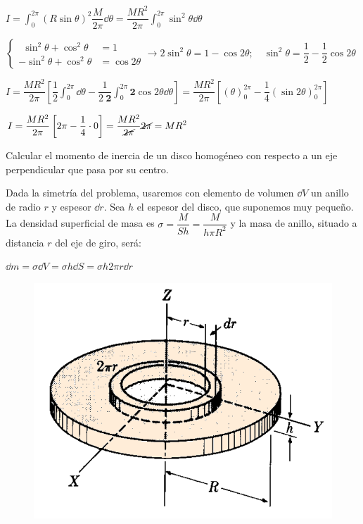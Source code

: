$\displaystyle I=\int_0^{2\pi} (R\sin \theta)^2 \dfrac {M}{2\pi} \dd \theta
= \dfrac{MR^2}{2\pi} \int_0^{2\pi} \sin^2 \theta \dd \theta$

\small{$\begin{cases} \ \ \sin^2 \theta+\cos^2\theta &=1 \\ -\sin^2\theta+\cos^2\theta &=\cos 2\theta \end{cases} \to 2\sin^2\theta=1-\cos 2\theta;\quad \sin^2\theta=\dfrac 1 2 -\dfrac 1 2 \cos 2 \theta$}

\normalsize{$\displaystyle I=\dfrac{MR^2}{2\pi} \left[ \dfrac 1 2 \int_0^{2\pi} \dd \theta - \dfrac 1 {2\ \boldsymbol{2}}\int_0^{2\pi}\boldsymbol{2}\cos 2\theta \dd \theta \right] $}$=\displaystyle \dfrac{MR^2}{2\pi} \left[ \left(\theta \right)_0^{2\pi}-\dfrac 1 4 \left( \sin 2\theta \right)_0^{2\pi} \right] $

$\displaystyle I=\dfrac{MR^2}{2\pi} \left[ 2\pi-\dfrac 1 4 \cdot 0 \right]=
\dfrac{MR^2}{\cancel{2\pi}} \cancel{2\pi}=MR^2$

\vspace{10mm} %
\begin{prob}
Calcular el momento de inercia de un disco homogéneo con respecto a un eje perpendicular que pasa por su centro.	
\end{prob}

\vspace{10mm} %
\begin{multicols}{2}
Dada la simetría del problema, usaremos con elemento de volumen $\dd V$ un anillo de radio $r$ y espesor $\dd r$. Sea $h$ el espesor del disco, que suponemos muy pequeño. La densidad superficial de masa es $\sigma=\dfrac M{Sh}=\dfrac{M}{h\pi R^2}$ y la masa de anillo, situado a distancia $r$ del eje de giro, será:

$\dd m =\sigma \dd V = \sigma h \dd S= \sigma h 2\pi r \dd r$
\begin{figure}[H]
	\centering
	\includegraphics[width=.5\textwidth]{imagenes/imagenes16/T16IM10.png}
\end{figure}
\end{multicols}

